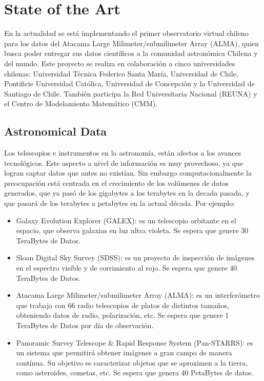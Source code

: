 \section{State of the Art}

En la actualidad se está implementando el primer observatorio virtual chileno
para los datos del Atacama Large Milimeter/submilimeter Array (ALMA), quien
busca poder entregar sus datos científicos a la comunidad astronómica Chilena y
del mundo. Este proyecto se realiza en colaboración a cinco universidades
chilenas: Universidad Técnica Federico Santa María, Universidad de Chile,
Pontificie Universidad Católica, Universidad de Concepción y la Universidad de
Santiago de Chile. También participa la Red Universitaria Nacional (REUNA) y el
Centro de Modelamiento Matemático (CMM).

\subsection{Astronomical Data}
Los telescopios e instrumentos en la astronomía, están afectos a los avances
tecnológicos. Este aspecto a nivel de información es muy provechoso, ya que
logran captar datos que antes no existían. Sin embargo computacionalmente la
preocupación está centrada en el crecimiento de los volúmenes de datos
generados, que ya pasó de los gigabytes a los terabytes en la decada pasada, y
que pasará de los terabytes a petabytes en la actual década. Por ejemplo:
\begin{itemize}
	\item Galaxy Evolution Explorer (GALEX): es un telescopio orbitante en
el espacio, que observa galaxias en luz ultra violeta. Se espera que genere 30
TeraBytes de Datos.
	\item Sloan Digital Sky Survey (SDSS): es un proyecto de inspección de
imágenes en el espectro visible y de corrimiento al rojo. Se espera que genere
40 TeraBytes de Datos.
	\item Atacama Large Milimeter/submilimeter Array (ALMA): es un
interferómetro que trabaja con 66 radio telescopios de platos de distintos
tamaños, obteniendo datos de radio, polarización, etc. Se espera que genere 1
TeraBytes de Datos por día de observación.
	\item Panoramic Survey Telescope \& Rapid Response System (Pan-STARRS):
es un sistema que permitirá obtener imágenes a gran campo de manera contínua.
Su objetivo es caracterizar objetos que se aproximen a la tierra, como
asteroides, cometas, etc. Se espera que genera 40 PetaBytes de datos.
\end{itemize}

